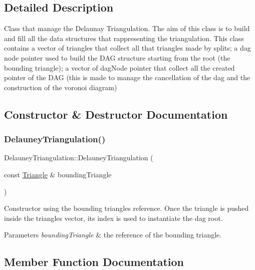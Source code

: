 \subsection{Detailed Description}
Class that manage the Delaunay Triangulation. The aim of this class is to build and fill all the data structures that rappresenting the triangulation. This class contains a vector of triangles that collect all that triangles made by splits; a dag node pointer used to build the D\+AG structure starting from the root (the bounding triangle); a vector of dag\+Node pointer that collect all the created pointer of the D\+AG (this is made to manage the cancellation of the dag and the construction of the voronoi diagram) 

\subsection{Constructor \& Destructor Documentation}
\mbox{\label{classDelauneyTriangulation_a25cb3fddd10968f7d4dcbdf25064b0aa}} 
\subsubsection{\texorpdfstring{Delauney\+Triangulation()}{DelauneyTriangulation()}}
{\footnotesize\ttfamily Delauney\+Triangulation\+::\+Delauney\+Triangulation (\begin{DoxyParamCaption}\item[{const \hyperlink{classTriangle}{Triangle} \&}]{bounding\+Triangle }\end{DoxyParamCaption})\hspace{0.3cm}{\ttfamily [inline]}}



Constructor using the bounding triangle\textquotesingle{}s reference. Once the triangle is pushed inside the triangles vector, its index is used to instantiate the dag root. 


\begin{DoxyParams}{Parameters}
{\em bounding\+Triangle} & the reference of the bounding triangle. \\
\hline
\end{DoxyParams}


\subsection{Member Function Documentation}
\mbox{\label{classDelauneyTriangulation_a7f41dfc218c0fdf3454e8360e6aaf115}} 
